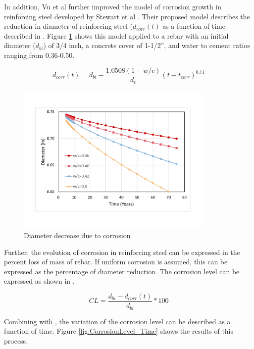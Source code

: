In addition, Vu et al  further improved the model of corrosion growth in reinforcing steel developed by Stewart et al \cite{Vu2000}\cite{Stewart1998}\cite{Choe2008}\cite{Ghosh2010}. Their proposed model describes the reduction in diameter of reinforcing steel ($d_{corr}(t)$ as a function of time described in . Figure \ref{fig:DiameterEvolution} shows this model applied to a rebar with an initial diameter ($d_{bi}$) of 3/4 inch, a concrete cover of 1-1/2”, and water to cement ratios ranging from 0.36-0.50.

\begin{equation}
  d_{corr}(t)=d_{bi}-\frac{1.0508(1-w/c)}{d_c} (t-t_{corr})^{0.71}
  \label{eq.CorrosionEvolution}
\end{equation} 

\begin{figure}[htbp]
\centering
\includegraphics[width=0.85\textwidth]{Chapter-2/figs/DiameterDecrease}
\caption{Diameter decrease due to corrosion}
\label{fig:DiameterEvolution}
\end{figure}

Further, the evolution of corrosion in reinforcing steel can be expressed in the percent loss of mass of rebar. If uniform corrosion is assumed, this can be expressed as the percentage of diameter reduction. The corrosion level can be expressed as shown in .

\begin{equation}
	CL=\frac{d_{bi}-d_{corr}(t)}{d_{bi}}*100%
  \label{eq.CorrosionLevel}
\end{equation} 

Combining  with ,  the variation of the corrosion level can be described as a function of time. Figure  \ref{fig:CorrosionLevel_Time} shows the results of this process.

